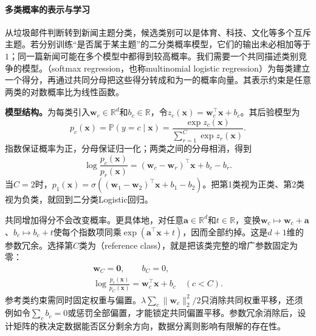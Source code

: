 \paragraph{多类概率的表示与学习}

\label{sec:classification-logistic-softmax}

从垃圾邮件判断转到新闻主题分类，候选类别可以是体育、科技、文化等多个互斥主题。若分别训练“是否属于某主题”的二分类概率模型，它们的输出未必相加等于$1$；同一篇新闻可能在多个模型中都得到较高概率。我们需要一个共同描述类别竞争的模型。（softmax regression，也称multinomial logistic regression）为每类建立一个得分，再通过共同分母把这些得分转成和为一的概率向量。其表示约束是任意两类的对数概率比为线性函数。

\textbf{模型结构。}为每类引入$\bm{w}_c\in\mathbb{R}^{d}$和$b_c\in\mathbb{R}$，令$z_c(\bm{x})=\bm{w}_c^{\top}\bm{x}+b_c$。其后验模型为
\begin{equation}
  \label{eq:classification-softmax-model}
  p_c(\bm{x})
  =\mathbb{P}(y=c\mid\bm{x})
  =\frac{\exp z_c(\bm{x})}
         {\sum_{r=1}^{C}\exp z_r(\bm{x})}.
\end{equation}
指数保证概率为正，分母保证归一化；两类之间的分母相消，得到
\[
  \log\frac{p_c(\bm{x})}{p_r(\bm{x})}
  =(\bm{w}_c-\bm{w}_r)^{\top}\bm{x}+b_c-b_r.
\]
当$C=2$时，$p_1(\bm{x})=\sigma((\bm{w}_1-\bm{w}_2)^{\top}\bm{x}+b_1-b_2)$。把第1类视为正类、第2类视为负类，就回到二分类Logistic回归。

共同增加得分不会改变概率。更具体地，对任意$\bm{a}\in\mathbb{R}^{d}$和$t\in\mathbb{R}$，变换$\bm{w}_c\mapsto\bm{w}_c+\bm{a}$、$b_c\mapsto b_c+t$使每个指数项同乘$\exp(\bm{a}^{\top}\bm{x}+t)$，因而全部约掉。这是$d+1$维的参数冗余。选择第$C$类为（reference class），就是把该类完整的增广参数固定为零：
\begin{equation}
  \label{eq:classification-softmax-reference}
  \begin{gathered}
    \bm{w}_C=\bm{0},\qquad b_C=0,\\
    \log\frac{p_c(\bm{x})}{p_C(\bm{x})}
    =\bm{w}_c^{\top}\bm{x}+b_c
    \quad(c<C).
  \end{gathered}
\end{equation}
参考类约束需同时固定权重与偏置。$\lambda\sum_c\lVert\bm{w}_c\rVert_2^2/2$只消除共同权重平移，还须例如令$\sum_c b_c=0$或惩罚全部偏置，才能锁定共同偏置平移。参数冗余消除后，设计矩阵的秩决定数据能否区分剩余方向，数据分离则影响有限解的存在性。

